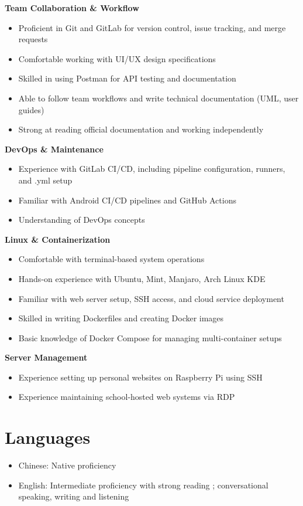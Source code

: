 \documentclass[a4paper,10pt]{article}
\begin{document}
\textbf{Team Collaboration \& Workflow}
\begin{itemize}[left=0pt, label={--}]
    \item Proficient in Git and GitLab for version control, issue tracking, and merge requests
    \item Comfortable working with UI/UX design specifications
    \item Skilled in using Postman for API testing and documentation
    \item Able to follow team workflows and write technical documentation (UML, user guides)
    \item Strong at reading official documentation and working independently
\end{itemize}

\textbf{DevOps \& Maintenance}
\begin{itemize}[left=0pt, label={--}]
    \item Experience with GitLab CI/CD, including pipeline configuration, runners, and .yml setup
    \item Familiar with Android CI/CD pipelines and GitHub Actions
    \item Understanding of DevOps concepts
\end{itemize}

\textbf{Linux \& Containerization}
\begin{itemize}[left=0pt, label={--}]
    \item Comfortable with terminal-based system operations
    \item Hands-on experience with Ubuntu, Mint, Manjaro, Arch Linux KDE
    \item Familiar with web server setup, SSH access, and cloud service deployment
    \item Skilled in writing Dockerfiles and creating Docker images
    \item Basic knowledge of Docker Compose for managing multi-container setups
\end{itemize}

\textbf{Server Management} 
\begin{itemize}[left=0pt, label={--}]
    \item Experience setting up personal websites on Raspberry Pi using SSH
    \item Experience maintaining school-hosted web systems via RDP
\end{itemize}

\section*{Languages}
\begin{itemize}[left=0pt, label={--}]
    \item Chinese: Native proficiency
    \item English: Intermediate proficiency with strong reading ; conversational speaking, writing and listening
\end{itemize}
\end{document}
